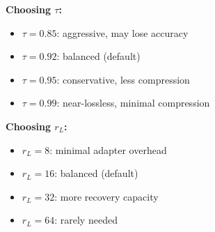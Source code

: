 \textbf{Choosing $\tau$:}

\begin{itemize}
\item $\tau = 0.85$: aggressive, may lose accuracy
\item $\tau = 0.92$: balanced (default)
\item $\tau = 0.95$: conservative, less compression
\item $\tau = 0.99$: near-lossless, minimal compression

\end{itemize}
\textbf{Choosing $r_L$:}

\begin{itemize}
\item $r_L = 8$: minimal adapter overhead
\item $r_L = 16$: balanced (default)
\item $r_L = 32$: more recovery capacity
\item $r_L = 64$: rarely needed
\end{itemize}
